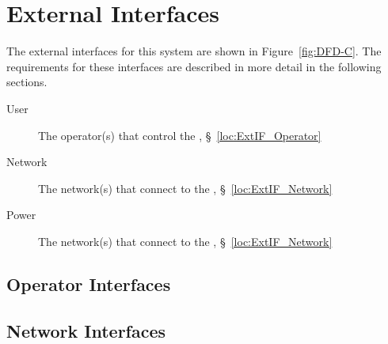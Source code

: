 \newpage
\section{External Interfaces}
\label{loc:ExternalInterfaces}
% 

The external interfaces for this system are shown in Figure~\ref{fig:DFD-C}.
The requirements for these interfaces are described in more detail in the following sections.
\begin{description}
	\item[User] The operator(s) that control the \ThisSys, \S~\ref{loc:ExtIF_Operator}
	\item[Network] The network(s) that connect to the \ThisSys, \S~\ref{loc:ExtIF_Network}
	\item[Power] The network(s) that connect to the \ThisSys, \S~\ref{loc:ExtIF_Network}
\end{description}

\KNEADSUBSECTIONNEWPAGE
\subsection{Operator Interfaces}
\label{loc:ExtIF_Operator}




\KNEADSUBSECTIONNEWPAGE
\subsection{Network Interfaces}
\label{loc:ExtIF_Network}

